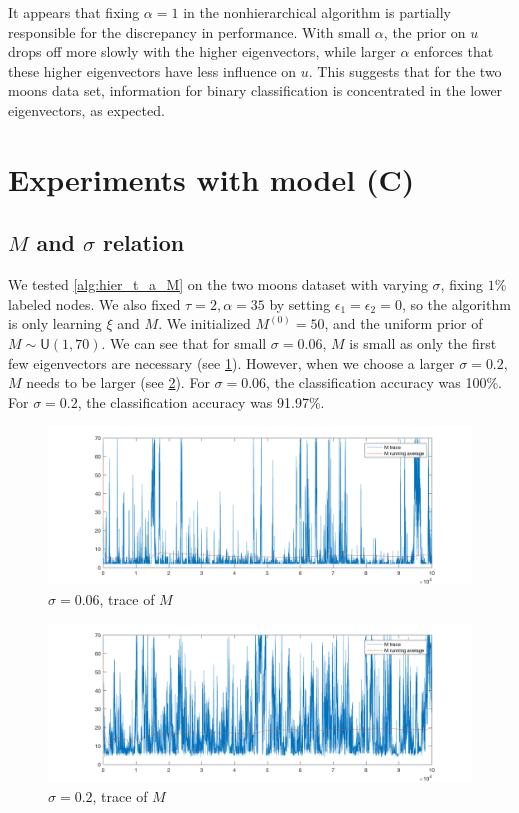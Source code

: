 \documentclass{siamart1116}
\begin{document}
        It appears that fixing $\alpha = 1$ in the nonhierarchical algorithm is partially responsible for the discrepancy in performance. With small $\alpha$, the prior on $u$ drops off more slowly with the higher eigenvectors, while larger $\alpha$ enforces that these higher eigenvectors have less influence on $u$. This suggests that for the two moons data set, information for binary classification is concentrated in the lower eigenvectors, as expected.

\section{Experiments with model (C)}
    \subsection{$M$ and $\sigma$ relation}
        We tested \cref{alg:hier_t_a_M} on the two moons dataset with varying $\sigma$, fixing $1\%$ labeled nodes. We also fixed $\tau=2,\alpha=35$ by setting $\epsilon_1=\epsilon_2=0$, so the algorithm is only learning $\xi$ and $M$. We initialized $M^{(0)} = 50$, and the uniform prior of $M \sim \mathsf{U}(1, 70)$. We can see that for small $\sigma = 0.06$, $M$ is small as only the first few eigenvectors are necessary (see \cref{fig:learnM_sigma_0.06}). However, when we choose a larger $\sigma = 0.2$, $M$ needs to be larger (see \cref{fig:learnM_sigma_0.20}). For $\sigma = 0.06$, the classification accuracy was 100\%. For $\sigma = 0.2$, the classification accuracy was 91.97\%.

        \begin{figure}[!htb]
        \caption{\label{fig:learnM_sigma_0.06} $\sigma=0.06$, trace of $M$}
        \includegraphics[width=\linewidth]{learnM/moons/hier/sigma_0_06/M_trace.png}
        \end{figure}
        \begin{figure}[!htb]
        \caption{\label{fig:learnM_sigma_0.20} $\sigma=0.2$, trace of $M$}
        \includegraphics[width=\linewidth]{learnM/moons/hier/sigma_0_20/M_trace.png}
        \end{figure}
    
\end{document}
